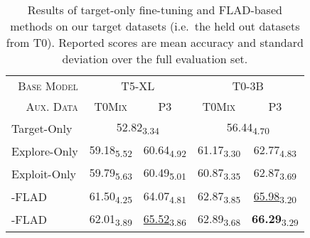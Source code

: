 \begin{table}[t]
\caption{Results of target-only fine-tuning and FLAD-based methods on our target datasets (i.e.\ the held out datasets from T0). Reported scores are mean accuracy and standard deviation over the full evaluation set.}
\label{tab:main_result}
\vskip 0.15in
\begin{center}
\begin{small}
\begin{tabular}{ l | c | c | c | c }
    \toprule
     \multicolumn{1}{r|}{\textsc{Base Model}} & \multicolumn{2}{c|}{\textsc{T5-XL}} & \multicolumn{2}{c}{\textsc{T0-3B}} \\
     \multicolumn{1}{r|}{\textsc{Aux. Data}} & \textsc{T0Mix} & \textsc{P3} & \textsc{T0Mix} & \textsc{P3}
     \\
     \midrule
    Target-Only & \multicolumn{2}{c|}{52.82\textsubscript{3.34}} & \multicolumn{2}{c}{56.44\textsubscript{4.70}} \\
    Explore-Only & 59.18\textsubscript{5.52} & 60.64\textsubscript{4.92} & 61.17\textsubscript{3.30} & 62.77\textsubscript{4.83} \\
    Exploit-Only & 59.79\textsubscript{5.63} & 60.49\textsubscript{5.01} & 60.87\textsubscript{3.35} & 62.87\textsubscript{3.69} \\
    \ex{}-FLAD & 61.50\textsubscript{4.25} & 64.07\textsubscript{4.81} & 62.87\textsubscript{3.85} & \underline{65.98}\textsubscript{3.20} \\
    \ucb{}-FLAD & 62.01\textsubscript{3.89} & \underline{65.52}\textsubscript{3.86} & 62.89\textsubscript{3.68} & \textbf{66.29}\textsubscript{3.29} \\
    \bottomrule
\end{tabular}
\end{small}
\end{center}
\vskip -0.1in
\end{table}


